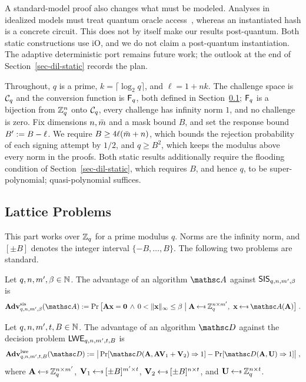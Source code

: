 A standard-model proof also changes what must be modeled. Analyses in idealized models must treat quantum oracle access~\cite{EC:KilLyuSch18}, whereas an instantiated hash is a concrete circuit. This does not by itself make our results post-quantum. Both static constructions use iO, and we do not claim a post-quantum instantiation. The adaptive deterministic port remains future work; the outlook at the end of Section~\ref{sec-dil-static} records the plan.

Throughout, $q$ is a prime, $k = \lceil \log_2 q\rceil$, and $\ell = 1 + nk$. The challenge space is $\mathcal{C}_q$ and the conversion function is $\mathsf{F}_q$, both defined in Section~\ref{sec-lattice}; $\mathsf{F}_q$ is a bijection from $\mathbb{Z}_q^n$ onto $\mathcal{C}_q$, every challenge has infinity norm $1$, and no challenge is zero. Fix dimensions $n, \bar m$ and a mask bound $B$, and set the response bound $B' := B - \ell$. We require $B \ge 4\ell(\bar m+n)$, which bounds the rejection probability of each signing attempt by $1/2$, and $q \ge B^2$, which keeps the modulus above every norm in the proofs. Both static results additionally require the flooding condition of Section~\ref{sec-dil-static}, which requires $B$, and hence $q$, to be super-polynomial; quasi-polynomial suffices. 

\subsection{Lattice Problems} \label{sec-lattice}

This part works over $\mathbb{Z}_q$ for a prime modulus $q$. Norms are the infinity norm, and $[\pm B]$ denotes the integer interval $\{-B,\ldots,B\}$. The following two problems are standard.

\begin{definition} \label{def-sis}
Let $q, n, m', \beta \in \mathbb N$. The advantage of an algorithm $\advA$ against $\mathsf{SIS}_{q,n,m',\beta}$ is
$$
\AdvSIS{q,n,m',\beta}{\advA}
:=
\Pr\big[\mat{A}\mat{x} = \mat{0} \,\land\, 0 < \|\mat{x}\|_\infty \le \beta
\;\big|\;
\mat{A} \getsr \Zq^{n \times m'},\ \mat{x} \getsr \advA(\mat{A})
\big] \;.
$$
\end{definition}

\begin{definition} \label{def-lwe}
Let $q, n, m', t, B \in \mathbb N$. The advantage of an algorithm $\advD$ against the decision problem $\mathsf{LWE}_{q,n,m',t,B}$ is
$$
\AdvLWE{q,n,m',t,B}{\advD}
:=
\big|
\Pr[\advD(\mat{A}, \mat{A}\mat{V}_1 + \mat{V}_2) \Rightarrow 1]
-
\Pr[\advD(\mat{A}, \mat{U}) \Rightarrow 1]
\big| \;,
$$
where $\mat{A} \getsr \Zq^{n \times m'}$, $\mat{V}_1 \getsr [\pm B]^{m' \times t}$, $\mat{V}_2 \getsr [\pm B]^{n \times t}$, and $\mat{U} \getsr \Zq^{n \times t}$.
\end{definition}

